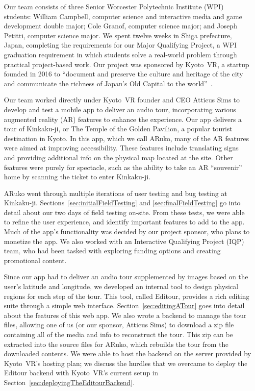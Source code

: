 \documentclass[a4paper, 10pt, american, titlepage]{article}
\begin{document}
Our team consists of three Senior Worcester Polytechnic Institute (WPI)
students: William Campbell, computer science and interactive media and game
development double major; Cole Granof, computer science major; and Joseph
Petitti, computer science major. We spent twelve weeks in Shiga prefecture, Japan,
completing the requirements for our Major Qualifying Project, a WPI graduation
requirement in which students solve a real-world problem through practical
project-based work. Our project was sponsored by Kyoto~VR, a startup founded in
2016 to ``document and preserve the culture and heritage of the city and
communicate the richness of Japan’s Old Capital to the
world''~\autocite{kyotovr2018}.

Our team worked directly under Kyoto~VR founder and CEO Atticus Sims to develop
and test a mobile app to deliver an audio tour, incorporating various
augmented reality (AR) features to enhance the experience. Our app delivers a
tour of Kinkaku-ji, or The Temple of the Golden Pavilion, a popular tourist
destination in Kyoto. In this app, which we call ARuko, many of the AR features
were aimed at improving accessibility. These features include translating signs
and providing additional info on the physical map located at the site. Other
features were purely for spectacle, such as the ability to take an AR
``souvenir'' home by scanning the ticket to enter Kinkaku-ji.

ARuko went through multiple iterations of user testing and bug testing at
Kinkaku-ji. Sections~\ref{sec:initialFieldTesting} and
\ref{sec:finalFieldTesting} go into detail about our two days of field testing
on-site. From these tests, we were able to refine the user experience, and
identify important features to add to the app. Much of the app's functionality
was decided by our project sponsor, who plans to monetize the app. We also
worked with an Interactive Qualifying Project (IQP) team, who had been tasked
with exploring funding options and creating promotional content.

Since our app had to deliver an audio tour supplemented by images based on the
user's latitude and longitude, we developed an internal tool to design physical
regions for each step of the tour. This tool, called Editour, provides a rich
editing suite through a simple web interface. Section~\ref{sec:editingATour}
goes into detail about the features of this web app. We also wrote a backend to
manage the tour files, allowing one of us (or our sponsor, Atticus Sims) to
download a zip file containing all of the media and info to reconstruct the
tour. This zip can be extracted into the source files for ARuko, which rebuilds
the tour from the downloaded contents. We were able to host the backend on the
server provided by Kyoto~VR's hosting plan; we discuss the hurdles that we
overcame to deploy the Editour backend with Kyoto~VR's current setup in
Section~\ref{sec:deployingTheEditourBackend}.
\end{document}

